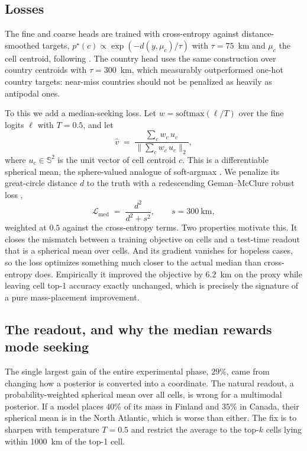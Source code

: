 \documentclass[11pt,a4paper]{article}
\begin{document}
\subsection{Losses}

The fine and coarse heads are trained with cross-entropy against distance-smoothed targets,
$p^\star(c) \propto \exp(-d(y, \mu_c)/\tau)$ with $\tau = 75$~km and $\mu_c$ the cell
centroid, following \cite{haas2024pigeon}. The country head uses the same construction over
country centroids with $\tau = 300$~km, which measurably outperformed one-hot country
targets: near-miss countries should not be penalized as heavily as antipodal ones.

To this we add a median-seeking loss. Let $w = \mathrm{softmax}(\ell / T)$ over the fine
logits $\ell$ with $T = 0.5$, and let
\begin{equation}
\hat{v} \;=\; \frac{\sum_c w_c\, u_c}{\lVert \sum_c w_c\, u_c \rVert_2},
\end{equation}
where $u_c \in \mathbb{S}^2$ is the unit vector of cell centroid $c$. This is a
differentiable spherical mean, the sphere-valued analogue of soft-argmax
\cite{sun2018integral}. We penalize its great-circle distance $d$ to the truth with a
redescending Geman--McClure robust loss \cite{geman1987statistical},
\begin{equation}
\mathcal{L}_{\mathrm{med}} \;=\; \frac{d^2}{d^2 + s^2}, \qquad s = 300\ \mathrm{km},
\end{equation}
weighted at $0.5$ against the cross-entropy terms. Two properties motivate this. It closes
the mismatch between a training objective on cells and a test-time readout that is a
spherical mean over cells. And its gradient vanishes for hopeless cases, so the loss
optimizes something much closer to the actual median than cross-entropy does. Empirically it
improved the objective by $6.2$~km on the proxy while leaving cell top-1 accuracy exactly
unchanged, which is precisely the signature of a pure mass-placement improvement.

\subsection{The readout, and why the median rewards mode seeking}
\label{sec:readout}

The single largest gain of the entire experimental phase, $29\%$, came from changing how a
posterior is converted into a coordinate. The natural readout, a probability-weighted
spherical mean over all cells, is wrong for a multimodal posterior. If a model places $40\%$
of its mass in Finland and $35\%$ in Canada, their spherical mean is in the North Atlantic,
which is worse than either. The fix is to sharpen with temperature $T = 0.5$ and restrict the
average to the top-$k$ cells lying within 1000~km of the top-1 cell.
\end{document}
